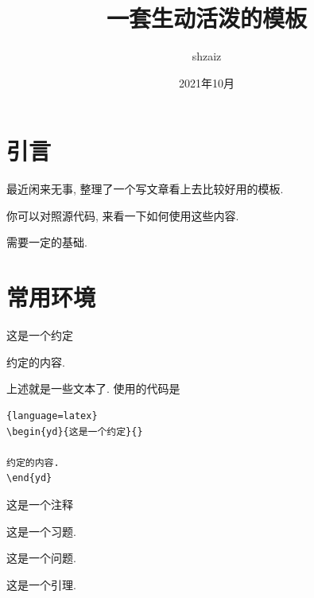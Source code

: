 \documentclass[a4,10pt]{ctexart}
\begin{document}
\title{一套生动活泼的模板}
\author{shzaiz}
\date{2021年10月}
\maketitle
\tableofcontents
\newpage
{}
\newpage



\section{引言}

最近闲来无事, 整理了一个写文章看上去比较好用的模板. 

你可以对照源代码, 来看一下如何使用这些内容.

需要一定的基础. 

\section{常用环境}
\begin{yd}{这是一个约定}{}
              
约定的内容.
\end{yd}

上述就是一些文本了. 使用的代码是
\begin{lstlisting}{language=latex}
\begin{yd}{这是一个约定}{}
              
约定的内容.
\end{yd}
\end{lstlisting}

\begin{zs}
        
这是一个注释
    
\end{zs}
    
\begin{xt}
        
这是一个习题.
    
\end{xt}
    
\begin{lt}
        
这是一个问题.
    
\end{lt}

\begin{yl}
        
这是一个引理.
    
\end{yl}
\end{document}
